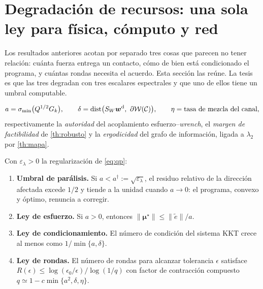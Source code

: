 \section{Degradación de recursos: una sola ley para física, cómputo y red}
\label{sec:degradacion}

Los resultados anteriores acotan por separado tres cosas que parecen no tener
relación: cuánta fuerza entrega un contacto, cómo de bien está condicionado el
programa, y cuántas rondas necesita el acuerdo. Esta sección las reúne. La tesis
es que las tres degradan con tres escalares espectrales y que uno de ellos tiene
un umbral computable.

\begin{definicion}
\label{def:recursos}
\[
  a=\sigma_{\min}\bigl(Q^{1/2}G_k\bigr),\qquad
  \delta=\operatorname{dist}\bigl(S_W\bm{w}^{\mathrm{d}},\ \partial\mathcal W(\mathcal{C})\bigr),\qquad
  \eta=\text{tasa de mezcla del canal},
\]
respectivamente la \emph{autoridad} del acoplamiento esfuerzo--\emph{wrench},
el \emph{margen de factibilidad} de \cref{th:robusto} y la \emph{ergodicidad}
del grafo de información, ligada a $\lambda_2$ por \cref{th:mapa}.
\end{definicion}

\begin{teorema}
\label{th:degradacion}
Con $\varepsilon_\lambda>0$ la regularización de \eqref{eq:qp}:
\begin{enumerate}[label=(\roman*),leftmargin=2.2em,topsep=0.2em,itemsep=0.2em]
  \item \textbf{Umbral de parálisis.} Si $a<a^{\dagger}:=\sqrt{\varepsilon_\lambda}$,
  el residuo relativo de la dirección afectada excede $1/2$ y tiende a la unidad
  cuando $a\to0$: el programa, convexo y óptimo, renuncia a corregir.
  \item \textbf{Ley de esfuerzo.} Si $a>0$, entonces
  $\lVert\bm\mu^{\star}\rVert\le\lVert\tilde e\rVert/a$.
  \item \textbf{Ley de condicionamiento.} El número de condición del sistema KKT
  crece al menos como $1/\min\{a,\delta\}$.
  \item \textbf{Ley de rondas.} El número de rondas para alcanzar tolerancia
  $\epsilon$ satisface
  $R(\epsilon)\le\log(\epsilon_0/\epsilon)/\log(1/q)$ con factor de contracción
  compuesto $q\simeq1-c\min\{a^{2},\delta,\eta\}$.
\end{enumerate}
\end{teorema}

